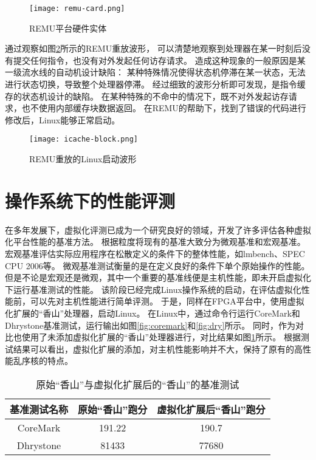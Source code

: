 \begin{figure}[htbp]
    \centering
\texttt{[image: remu-card.png]}
    \caption{REMU平台硬件实体}
    \label{fig:remu-card}
\end{figure}

通过观察如图\ref{fig:console-block-wave}所示的REMU重放波形，
可以清楚地观察到处理器在某一时刻后没有提交任何指令，也没有对外发起任何访存请求。
造成这种现象的一般原因是某一级流水线的自动机设计缺陷：
某种特殊情况使得状态机停滞在某一状态，无法进行状态切换，导致整个处理器停滞。
经过细致的波形分析即可发现，是指令缓存的状态机设计的缺陷。
在某种特殊的不命中的情况下，既不对外发起访存请求，也不使用内部缓存块数据返回。
在REMU的帮助下，找到了错误的代码进行修改后，Linux能够正常启动。

\begin{figure}[htbp]
    \centering
\texttt{[image: icache-block.png]}
    \caption{REMU重放的Linux启动波形}
    \label{fig:console-block-wave}
\end{figure}

\section{操作系统下的性能评测}
在多年发展下，虚拟化评测已成为一个研究良好的领域，开发了许多评估各种虚拟化平台性能的基准方法。
根据粒度将现有的基准大致分为微观基准和宏观基准。
宏观基准评估实际应用程序在松散定义的条件下的整体性能，如lmbench、SPEC CPU 2006等。
微观基准测试衡量的是在定义良好的条件下单个原始操作的性能。
但是不论是宏观还是微观，其中一个重要的基准线便是主机性能，即未开启虚拟化下运行基准测试的性能。
该阶段已经完成Linux操作系统的启动，在评估虚拟化性能前，可以先对主机性能进行简单评测。
于是，同样在FPGA平台中，使用虚拟化扩展的“香山”处理器，启动Linux。
在Linux中，通过命令行运行CoreMark和Dhrystone基准测试，运行输出如图\ref{fig:coremark}和\ref{fig:dry}所示。
同时，作为对比也使用了未添加虚拟化扩展的“香山”处理器进行，对比结果如图\ref{tab:perf}所示。
根据测试结果可以看出，虚拟化扩展的添加，对主机性能影响并不大，保持了原有的高性能乱序核的特点。

\begin{table}
    \centering
    \caption{原始“香山”与虚拟化扩展后的“香山”的基准测试}
    \begin{tabular}{ccc}
        \toprule
        基准测试名称   & 原始“香山”跑分 & 虚拟化扩展后“香山”跑分 \\
        \midrule
        CoreMark & 191.22   & 190.7        \\
Dhrystone & 81433   & 77680        \\
        \bottomrule
    \end{tabular}
    \label{tab:perf}
\end{table}

